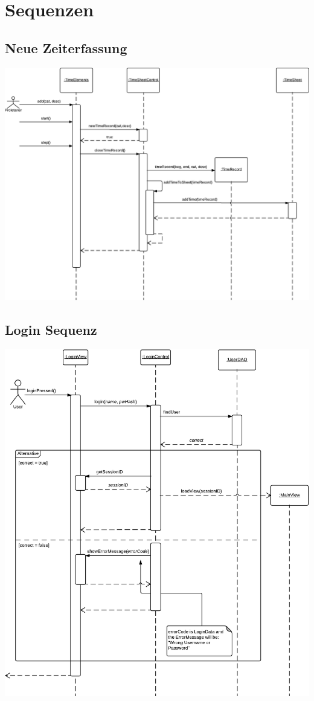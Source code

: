 \section{Sequenzen}
    \subsection{Neue Zeiterfassung}
        \includegraphics[width=\linewidth]{"Diagramms/sequenzes/new_Time_record.pdf"}\\
    \subsection{Login Sequenz}
        \includegraphics[width=\linewidth]{"Diagramms/sequenzes/login.pdf"}\\
